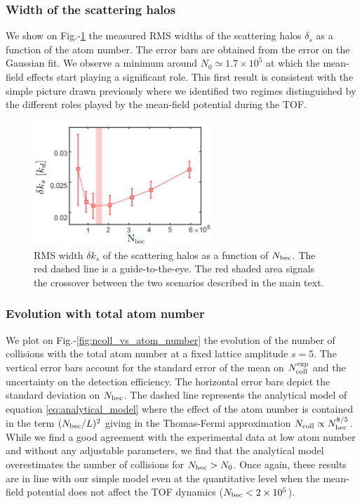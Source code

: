 \subsubsection{Width of the scattering halos}

\label{sec:width_halos}

We show on Fig.-\ref{fig:largeur_spheres} the measured RMS widths of the scattering halos $\delta_s$ as a function of the atom number. The error bars are obtained from the error on the Gaussian fit. We observe a minimum around $N_0 \simeq 1.7 \times 10^5$ at which the mean-field effects start playing a significant role. This first result is consistent with the simple picture drawn previously where we identified two regimes distinguished by the different roles played by the mean-field potential during the TOF.

\begin{figure}
    \centering
    \includegraphics[width=0.6\textwidth]{Fig/Chapter3/largeur_spheres.png}
    \caption[RMS width $\delta k_s$ of the scattering halos as a function of $N_{\rm{bec}}$]{RMS width $\delta k_s$ of the scattering halos as a function of $N_{\rm{bec}}$. The red dashed line is a guide-to-the-eye. The red shaded area signals the crossover between the two scenarios described in the main text.}
    \label{fig:largeur_spheres}
\end{figure}

\subsubsection{Evolution with total atom number}

We plot on Fig.-\ref{fig:ncoll_vs_atom_number} the evolution of the number of collisions with the total atom number at a fixed lattice amplitude $s=5$. The vertical error bars account for the standard error of the mean on $N_{\rm{coll}}^{\rm{exp}}$ and the uncertainty on the detection  efficiency. The horizontal error  bars depict the standard deviation on $N_{\rm{bec}}$. The dashed line represents the analytical model of equation \ref{eq:analytical_model} where the effect of the atom number is contained in the term $(N_{\rm{bec}}/L)^2$ giving in the Thomas-Fermi approximation $N_{\rm{coll}} \propto N_{\rm{bec}}^{8/5}$. While we find a good agreement with the experimental data at low atom number and without any adjustable parameters, we find that the analytical model overestimates the number of collisions for $N_{\rm{bec}} > N_0$. Once again, these results are in line with our simple model even at the quantitative level when the mean-field potential does not affect the TOF dynamics ($N_{\rm{bec}} < 2 \times 10^5$).


